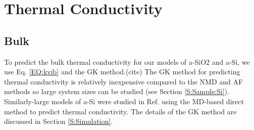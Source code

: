 \documentclass[aps,prb,twocolumn,superscriptaddress,footinbib,amsmath,amssymb,floatfix]{revtex4}
\begin{document}


\section{\label{S:Conductivity}Thermal Conductivity}

\subsection{\label{S:Bulk}Bulk}

To predict the bulk thermal conductivity for our models of a-SiO2 and 
a-Si, we use Eq. \eqref{EQ:kvib} 
and the GK method.(cite) The GK method for predicting 
thermal conductivity
is relatively inexpensive compared to the NMD and AF methods so  
large system sizes can be studied (see Section \ref{S:Sample:Si}).  
Similarly-large 
models of a-Si were studied in Ref.  using the 
MD-based direct method to predict thermal conductivity. The 
details of the GK method are discussed in Section \ref{S:Simulation}. 
\end{document}
